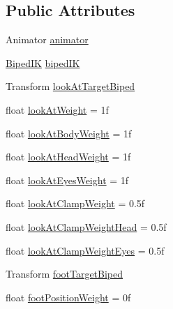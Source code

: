\subsection*{Public Attributes}
\begin{DoxyCompactItemize}
\item 
Animator \mbox{\hyperlink{class_root_motion_1_1_demos_1_1_biped_i_kvs_animator_i_k_a5820f87ced56c7497a9de3e2678810df}{animator}}
\item 
\mbox{\hyperlink{class_root_motion_1_1_final_i_k_1_1_biped_i_k}{Biped\+IK}} \mbox{\hyperlink{class_root_motion_1_1_demos_1_1_biped_i_kvs_animator_i_k_ab99880961d150a275bd044a6e55f1d22}{biped\+IK}}
\item 
Transform \mbox{\hyperlink{class_root_motion_1_1_demos_1_1_biped_i_kvs_animator_i_k_a1c29c3981e05882759fea062ecc10b94}{look\+At\+Target\+Biped}}
\item 
float \mbox{\hyperlink{class_root_motion_1_1_demos_1_1_biped_i_kvs_animator_i_k_a1c483d2ad205feba889e50fcb2369e64}{look\+At\+Weight}} = 1f
\item 
float \mbox{\hyperlink{class_root_motion_1_1_demos_1_1_biped_i_kvs_animator_i_k_a3132f656858dda234edd5ec54f271090}{look\+At\+Body\+Weight}} = 1f
\item 
float \mbox{\hyperlink{class_root_motion_1_1_demos_1_1_biped_i_kvs_animator_i_k_af6355f64a98768c2e4d73dfb790de92e}{look\+At\+Head\+Weight}} = 1f
\item 
float \mbox{\hyperlink{class_root_motion_1_1_demos_1_1_biped_i_kvs_animator_i_k_a78e194b8536d8666eb61bd5c7e1b0ff6}{look\+At\+Eyes\+Weight}} = 1f
\item 
float \mbox{\hyperlink{class_root_motion_1_1_demos_1_1_biped_i_kvs_animator_i_k_acb253b8af132da5c728fd6022e278a71}{look\+At\+Clamp\+Weight}} = 0.\+5f
\item 
float \mbox{\hyperlink{class_root_motion_1_1_demos_1_1_biped_i_kvs_animator_i_k_a93368b7c0600706c8b99d90f67792128}{look\+At\+Clamp\+Weight\+Head}} = 0.\+5f
\item 
float \mbox{\hyperlink{class_root_motion_1_1_demos_1_1_biped_i_kvs_animator_i_k_a3fe66c95c5ef33fefb30406aba6fa58d}{look\+At\+Clamp\+Weight\+Eyes}} = 0.\+5f
\item 
Transform \mbox{\hyperlink{class_root_motion_1_1_demos_1_1_biped_i_kvs_animator_i_k_a15f971d7fa915745b07c092d3f683802}{foot\+Target\+Biped}}
\item 
float \mbox{\hyperlink{class_root_motion_1_1_demos_1_1_biped_i_kvs_animator_i_k_a136064dcb6461dfb277602965675049f}{foot\+Position\+Weight}} = 0f

\end{DoxyCompactItemize}
